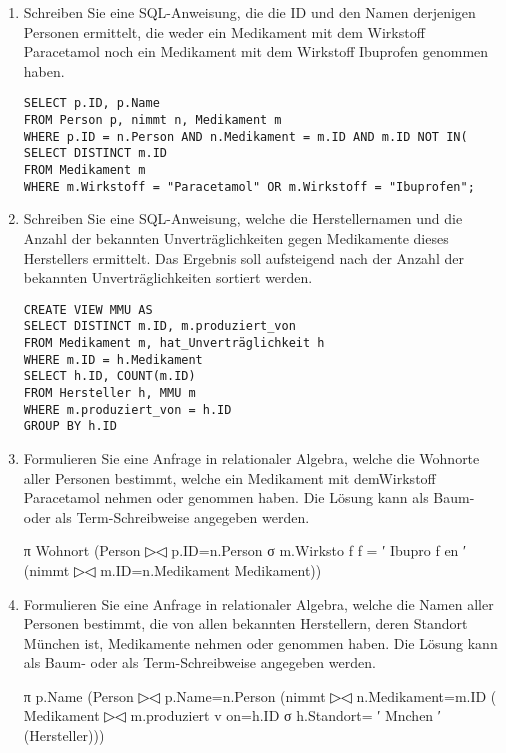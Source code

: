 \documentclass{lehramt-informatik-aufgabe}
\begin{document}
\begin{enumerate}

\item Schreiben Sie eine SQL-Anweisung, die die ID und den Namen derjenigen
Personen ermittelt, die weder ein Medikament mit dem Wirkstoff
Paracetamol noch ein Medikament mit dem Wirkstoff Ibuprofen genommen
haben.

\begin{liAntwort}
\begin{verbatim}
SELECT p.ID, p.Name
FROM Person p, nimmt n, Medikament m
WHERE p.ID = n.Person AND n.Medikament = m.ID AND m.ID NOT IN(
SELECT DISTINCT m.ID
FROM Medikament m
WHERE m.Wirkstoff = "Paracetamol" OR m.Wirkstoff = "Ibuprofen";
\end{verbatim}
\end{liAntwort}


\item Schreiben Sie eine SQL-Anweisung, welche die Herstellernamen und die
Anzahl der bekannten Unverträglichkeiten gegen Medikamente dieses
Herstellers ermittelt. Das Ergebnis soll aufsteigend nach der Anzahl der
bekannten Unverträglichkeiten sortiert werden.

\begin{liAntwort}
\begin{verbatim}
CREATE VIEW MMU AS
SELECT DISTINCT m.ID, m.produziert_von
FROM Medikament m, hat_Unverträglichkeit h
WHERE m.ID = h.Medikament
SELECT h.ID, COUNT(m.ID)
FROM Hersteller h, MMU m
WHERE m.produziert_von = h.ID
GROUP BY h.ID
\end{verbatim}
\end{liAntwort}


\item Formulieren Sie eine Anfrage in relationaler Algebra, welche die
Wohnorte aller Personen bestimmt, welche ein Medikament mit demWirkstoff
Paracetamol nehmen oder genommen haben. Die Lösung kann als Baum- oder
als Term-Schreibweise angegeben werden.

\begin{liAntwort}
π Wohnort (Person ▷◁ p.ID=n.Person σ m.Wirksto f f = ′ Ibupro f en ′ (nimmt ▷◁ m.ID=n.Medikament Medikament))
\end{liAntwort}


\item Formulieren Sie eine Anfrage in relationaler Algebra, welche die Namen
aller Personen bestimmt, die von allen bekannten Herstellern, deren
Standort München ist, Medikamente nehmen oder genommen haben. Die Lösung
kann als Baum- oder als Term-Schreibweise angegeben werden.

\begin{liAntwort}
π p.Name (Person ▷◁ p.Name=n.Person (nimmt ▷◁ n.Medikament=m.ID (
Medikament ▷◁ m.produziert v on=h.ID σ h.Standort= ′ Mnchen ′ (Hersteller)))
\end{liAntwort}

\end{enumerate}
\end{document}
